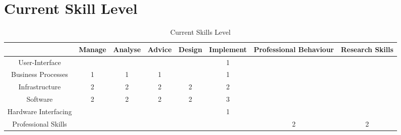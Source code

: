 
\section{Current Skill Level}
\label{sec:current}

\begin{table}[H]
	\centering
	\begin{tabular}{|c|c|c|c|c|c|c|c|}
		\hline
		& Manage & Analyse & Advice & Design & Implement & Professional Behaviour & Research Skills \\ \hline
		User-Interface & & & & & 1 & & \\ \hline
		Business Processes & 1 & 1 & 1 & & 1 &  &  \\ \hline
		Infrastructure & 2 & 2 & 2 & 2 & 2 & & \\ \hline
		Software & 2 & 2 & 2 & 2 & 3 & & \\ \hline
		Hardware Interfacing & & & & & 1 & & \\ \hline
		Professional Skills & & & & & & 2 & 2 \\ \hline
	\end{tabular}
	\caption{Current Skills Level}
	\label{currentskills}
\end{table}